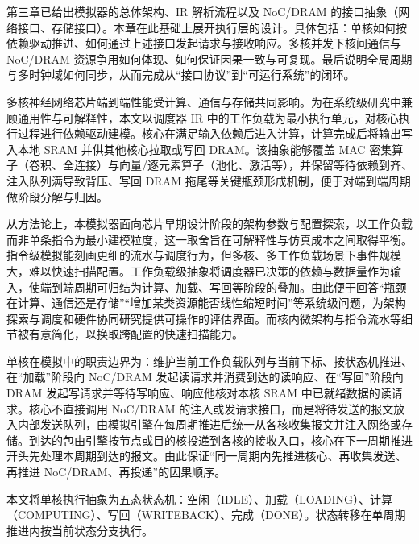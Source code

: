 

第三章已给出模拟器的总体架构、IR 解析流程以及 NoC/DRAM 的接口抽象（网络接口、存储接口）。本章在此基础上展开执行层的设计。具体包括：单核如何按依赖驱动推进、如何通过上述接口发起请求与接收响应。多核并发下核间通信与 NoC/DRAM 资源争用如何体现、如何保证因果一致与可复现。最后说明全局周期与多时钟域如何同步，从而完成从“接口协议”到“可运行系统”的闭环。



多核神经网络芯片端到端性能受计算、通信与存储共同影响。为在系统级研究中兼顾通用性与可解释性，本文以调度器 IR 中的工作负载为最小执行单元，对核心执行过程进行依赖驱动建模。核心在满足输入依赖后进入计算，计算完成后将输出写入本地 SRAM 并供其他核心拉取或写回 DRAM。该抽象能够覆盖 MAC 密集算子（卷积、全连接）与向量/逐元素算子（池化、激活等），并保留等待依赖到齐、注入队列满导致背压、写回 DRAM 拖尾等关键瓶颈形成机制，便于对端到端周期做阶段分解与归因。

从方法论上，本模拟器面向芯片早期设计阶段的架构参数与配置探索，以工作负载而非单条指令为最小建模粒度，这一取舍旨在可解释性与仿真成本之间取得平衡。指令级模拟能刻画更细的流水与调度行为，但多核、多工作负载场景下事件规模大，难以快速扫描配置。工作负载级抽象将调度器已决策的依赖与数据量作为输入，使端到端周期可归结为计算、加载、写回等阶段的叠加。由此便于回答“瓶颈在计算、通信还是存储”“增加某类资源能否线性缩短时间”等系统级问题，为架构探索与调度和硬件协同研究提供可操作的评估界面。而核内微架构与指令流水等细节被有意简化，以换取跨配置的快速扫描能力。

单核在模拟中的职责边界为：维护当前工作负载队列与当前下标、按状态机推进、在“加载”阶段向 NoC/DRAM 发起读请求并消费到达的读响应、在“写回”阶段向 DRAM 发起写请求并等待写响应、响应他核对本核 SRAM 中已就绪数据的读请求。核心不直接调用 NoC/DRAM 的注入或发请求接口，而是将待发送的报文放入内部发送队列，由模拟引擎在每周期推进后统一从各核收集报文并注入网络或存储。到达的包由引擎按节点或目的核投递到各核的接收入口，核心在下一周期推进开头先处理本周期到达的报文。由此保证“同一周期内先推进核心、再收集发送、再推进 NoC/DRAM、再投递”的因果顺序。


本文将单核执行抽象为五态状态机：空闲（IDLE）、加载（LOADING）、计算（COMPUTING）、写回（WRITEBACK）、完成（DONE）。状态转移在单周期推进内按当前状态分支执行。

